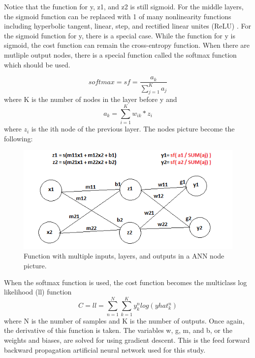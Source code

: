 \documentclass[12pt, oneside]{book}
\begin{document}
Notice that the function for y, z1, and z2 is still sigmoid. For the middle layers, the sigmoid function can be replaced with 1 of many nonlinearity functions including hyperbolic tangent, linear, step, and rectified linear unites (ReLU) \cite{heaton_artificial_2015}. For the sigmoid function for y, there is a special case. While the function for y is sigmoid, the cost function can remain the cross-entropy function. When there are mutliple output nodes, there is a special function called the softmax function which should be used. \cite{lazyprogrammer.me_data_nodate}

\begin{equation}
softmax=sf=\frac{a_{k}}{\sum_{j=1}^{K}a_{j}}
\end{equation}
where K is the number of nodes in the layer before y and
\begin{equation}
a_{k} = \sum_{i=1}^{K}w_{ik}*z_{i}
\end{equation}
where \(z_{i}\) is the ith node of the previous layer. \cite{lazyprogrammer.me_data_nodate} The nodes picture become the following: 

\begin{figure}[H]
	\centering
	\includegraphics[]{mANNNodes.png}
	\caption{Function with multiple inputs, layers, and outputs in a ANN node picture.}
	\label{fig:mANNNode}
\end{figure}

When the softmax function is used, the cost function becomes the multiclass log likelihood (ll) function 
\begin{equation}
C =ll = \sum_{n=1}^{N} \sum_{k=1}^{K} y_{k}^{n}log(yhat_{k}^{n})
\end{equation}
where N is the number of samples and K is the number of outputs. Once again, the derivative of this function is taken. The variables w, g, m, and b, or the weights and biases, are solved for using gradient descent. This is the feed forward backward propagation artificial neural network used for this study. \cite{lazyprogrammer.me_data_nodate}
\end{document}

